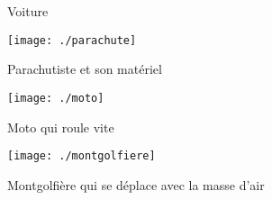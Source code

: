 \begin{corrige}
Voiture

\begin{center}
\end{center}
\end{corrige}

\begin{exercice}
\begin{center}
    \texttt{[image: ./parachute]} 
    
    Parachutiste et son matériel
\end{center}
\end{exercice}



\begin{exercice}
\begin{center}
    \texttt{[image: ./moto]}
    
    Moto qui roule vite
\end{center}
\end{exercice}



\begin{exercice}\label{doiLast}
\begin{center}
    \texttt{[image: ./montgolfiere]}
    
    Montgolfière qui se déplace avec la masse d'air
\end{center}
\end{exercice}


























































